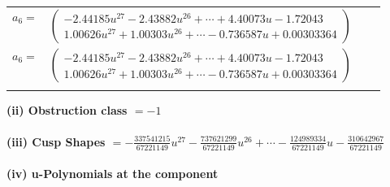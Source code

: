 \documentclass[1p]{elsarticle_modified}
\theoremstyle{definition}
\begin{document}
\begin{tabular}{m{7pt} m{180pt} m{7pt} m{180pt} }
\flushright $a_{6}=$&$\begin{pmatrix}-2.44185 u^{27}-2.43882 u^{26}+\cdots+4.40073 u-1.72043\\1.00626 u^{27}+1.00303 u^{26}+\cdots-0.736587 u+0.00303364\end{pmatrix}$\\ \flushright $a_{6}=$&$\begin{pmatrix}-2.44185 u^{27}-2.43882 u^{26}+\cdots+4.40073 u-1.72043\\1.00626 u^{27}+1.00303 u^{26}+\cdots-0.736587 u+0.00303364\end{pmatrix}$\\&\end{tabular}
\flushleft \textbf{(ii) Obstruction class $= -1$}\\~\\
\flushleft \textbf{(iii) Cusp Shapes $= -\frac{337541215}{67221149} u^{27}-\frac{737621299}{67221149} u^{26}+\cdots-\frac{124989334}{67221149} u-\frac{310642967}{67221149}$}\\~\\
\newpage\renewcommand{\arraystretch}{1}
\flushleft \textbf{(iv) u-Polynomials at the component}\newline \\
\end{document}
